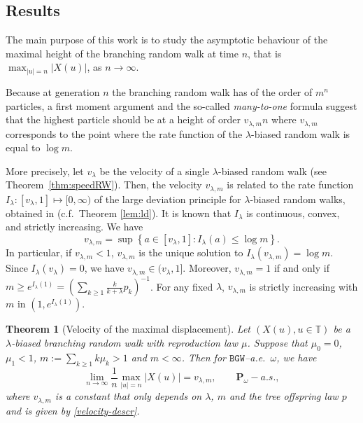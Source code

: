 \documentclass[11 pt]{article}
\newtheorem{theorem}{Theorem}[section]
\theoremstyle{definition}
\numberwithin{equation}{section}
\newcommand\TODO[1]{\texttt{\textcolor{red}{[#1]}}} %
\newcommand{\TT}{\mathbb{T}} %
\newcommand{\Pw}{\mathbf{P}_{\omega}} %
\begin{document}
\subsection{Results}\label{Results}

The main purpose of this work is to study the asymptotic behaviour of the maximal height of the branching random walk at time $n$, that is $ \max_{|u|=n} |X(u)|$, as $n\to \infty$. 

Because at generation $n$ the branching random walk has of the order of $m^n$ particles, a first moment argument and the so-called {\it many-to-one} formula suggest that the highest particle should be at a height of order $v_{\lambda,m} n $ where $v_{\lambda,m} $ corresponds to the point where the rate function of the $\lambda$-biased random walk is equal to $\log m$.  

More precisely, let $v_{\lambda}$ be the velocity of a single $\lambda$-biased random walk (see Theorem~\ref{thm:speedRW}). 
Then, the velocity $v_{\lambda,m}$ is related to the rate function $I_{\lambda}: [v_{\lambda},1]\mapsto [0,\infty)$ of the large deviation principle for $\lambda$-biased random walks, obtained in \cite{DGPZ-ld} (c.f.\ Theorem \ref{lem:ld}). It is known that $I_\lambda$ is continuous, convex, and strictly increasing. 
We have 
\begin{equation} \label{velocity-descr}
	v_{\lambda, m}= \sup\left\{a\in [v_{\lambda},1]: I_{\lambda} (a) \le \log  m \right\} .
\end{equation}
In particular, if $v_{\lambda, m} < 1$, $v_{\lambda, m}$ is the unique solution to $I_\lambda(v_{\lambda, m}) =\log m$. 
Since $I_\lambda(v_{\lambda}) =0$, we have $v_{\lambda, m}\in (v_{\lambda},1]$. Moreover, $v_{\lambda, m}=1$ if and only if 
$m \ge e^{I_{\lambda}(1)}= (\sum_{k\ge 1} \frac{k}{k+\lambda} p_k )^{-1}$. For any fixed $\lambda$, $v_{\lambda, m}$ is strictly increasing with $m$ in $(1, e^{I_{\lambda}(1)})$. 

\begin{theorem}[Velocity of the maximal displacement] \label{thm:max}
	Let $(X(u),u\in \TT)$ be a $\lambda$-biased branching random walk with reproduction law $\mu$. 
	Suppose that $\mu_0=0$, $\mu_1<1$, $m:= \sum_{k\ge 1} k \mu_k >1$ and $m<\infty$.
	Then for $\mathtt{BGW}$--a.e.\ $\omega$, we have
	\[
	\lim_{n\to \infty} \frac{1}{n} \max_{|u|=n} |X(u)|  =  v_{\lambda, m}, \qquad \Pw-a.s., 
	\]
	where $v_{\lambda, m}$ is a constant that only depends on $\lambda$, $m$ and the 
	 tree offspring law $p$ and is given by \eqref{velocity-descr}.
\end{theorem}
\end{document}
